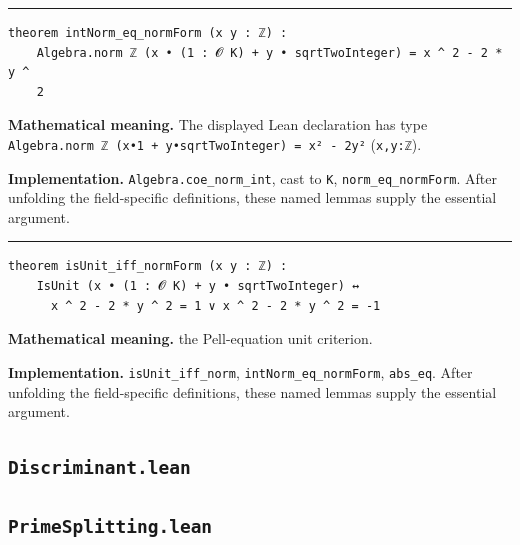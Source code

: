 \documentclass[UTF8,a4paper,11pt,fontset=fandol]{ctexart}
\theoremstyle{definition}
\newcommand{\statementsep}{\par\medskip\hrule\medskip}
\begin{document}
\statementsep
\begin{verbatim}
theorem intNorm_eq_normForm (x y : ℤ) :
    Algebra.norm ℤ (x • (1 : 𝓞 K) + y • sqrtTwoInteger) = x ^ 2 - 2 * y ^
    2
\end{verbatim}
\noindent\textbf{Mathematical meaning.} The displayed Lean declaration has type \texttt{Algebra.\allowbreak{}norm ℤ (x•1 + y•sqrtTwoInteger) = x² - 2y²} (\texttt{x,y:ℤ}).\par
\noindent\textbf{Implementation.} \texttt{Algebra.\allowbreak{}coe\_\allowbreak{}norm\_\allowbreak{}int}, cast to \texttt{K}, \texttt{norm\_\allowbreak{}eq\_\allowbreak{}normForm}. After unfolding the field-specific definitions, these named lemmas supply the essential argument.\par
\statementsep
\begin{verbatim}
theorem isUnit_iff_normForm (x y : ℤ) :
    IsUnit (x • (1 : 𝓞 K) + y • sqrtTwoInteger) ↔
      x ^ 2 - 2 * y ^ 2 = 1 ∨ x ^ 2 - 2 * y ^ 2 = -1
\end{verbatim}
\noindent\textbf{Mathematical meaning.} the Pell-equation unit criterion.\par
\noindent\textbf{Implementation.} \texttt{isUnit\_\allowbreak{}iff\_\allowbreak{}norm}, \texttt{intNorm\_\allowbreak{}eq\_\allowbreak{}normForm}, \texttt{abs\_\allowbreak{}eq}. After unfolding the field-specific definitions, these named lemmas supply the essential argument.\par

\subsection{\texttt{Discriminant.lean}}


\subsection{\texttt{PrimeSplitting.lean}}
\end{document}
